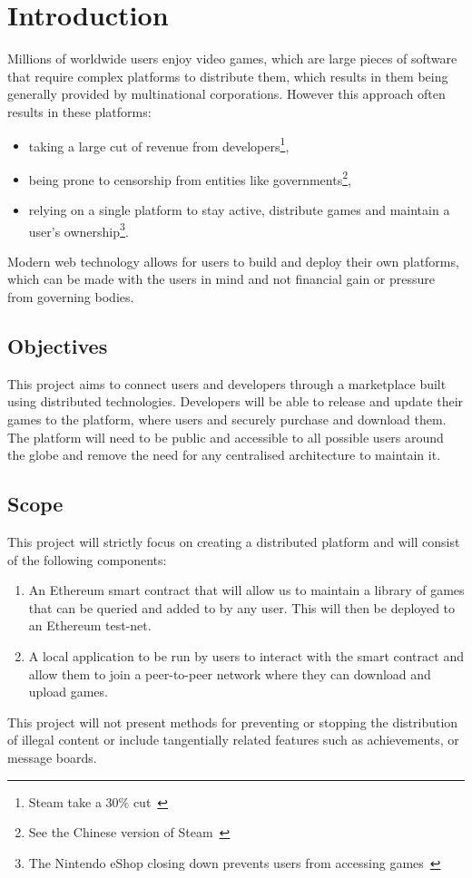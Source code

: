 
\chapter{Introduction}\label{sec:problem}

Millions of worldwide users enjoy video games, which are large pieces of software that require complex platforms to distribute them, which results in them being generally provided by multinational corporations. However this approach often results in these platforms:

\begin{itemize}
  \item taking a large cut of revenue from developers\footnote{Steam take a 30\% cut~\cite{marks_report_2019,brown_valve_2021}},
  \item being prone to censorship from entities like governments\footnote{See the Chinese version of Steam~\cite{noauthor_steam_nodate-1}},
  \item relying on a single platform to stay active, distribute games and maintain a user's ownership\footnote{The Nintendo eShop closing down prevents users from accessing games~\cite{noauthor_nintendo_2022}}.
\end{itemize}

\newparagraph
Modern web technology allows for users to build and deploy their own platforms, which can be made with the users in mind and not financial gain or pressure from governing bodies. 

\section{Objectives}

This project aims to connect users and developers through a marketplace built using distributed technologies. Developers will be able to release and update their games to the platform, where users and securely purchase and download them. The platform will need to be public and accessible to all possible users around the globe and remove the need for any centralised architecture to maintain it.

\section{Scope}

This project will strictly focus on creating a distributed platform and will consist of the following components:

\begin{enumerate}
  \item An Ethereum smart contract that will allow us to maintain a library of games that can be queried and added to by any user. This will then be deployed to an Ethereum test-net.
  \item A local application to be run by users to interact with the smart contract and allow them to join a peer-to-peer network where they can download and upload games.
\end{enumerate}

\newparagraph
This project will not present methods for preventing or stopping the distribution of illegal content or include tangentially related features such as achievements, or message boards.
